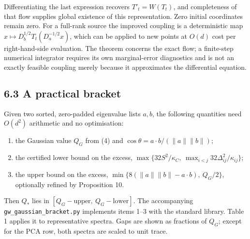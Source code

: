 \documentclass[
  british,
  11pt,
  a4paper,
]{article}
\providecommand{\tightlist}{%
  \setlength{\itemsep}{0pt}\setlength{\parskip}{0pt}}
\begin{document}
Differentiating the last expression recovers \(T'_t=W(T_t)\), and
completeness of that flow supplies global existence of this
representation. Zero initial coordinates remain zero. For a full-rank
source the improved coupling is a deterministic map
\(x\mapsto D_b^{1/2}T_t(D_a^{-1/2}x)\), which can be applied to new
points at \(O(d)\) cost per right-hand-side evaluation. The theorem
concerns the exact flow; a finite-step numerical integrator requires its
own marginal-error diagnostics and is not an exactly feasible coupling
merely because it approximates the differential equation.

\subsection{6.3 A practical bracket}\label{a-practical-bracket}

Given two sorted, zero-padded eigenvalue lists \(a,b\), the following
quantities need \(O(d^2)\) arithmetic and no optimisation:

\begin{enumerate}
\def\labelenumi{\arabic{enumi}.}
\tightlist
\item
  the Gaussian value \(Q_G\) from (4) and
  \(\cos\theta=a\cdot b/(\|a\|\|b\|)\);
\item
  the certified lower bound on the excess,
  \(\max\{32S^2/\kappa_C,\ \max_{i<j}32\Delta_{ij}^2/\kappa_{ij}\}\);
\item
  the upper bound on the excess,
  \(\min\{8(\|a\|\|b\|-a\cdot b),\ Q_G/2\}\), optionally refined by
  Proposition 10.
\end{enumerate}

Then \(Q_*\) lies in \([Q_G-\text{upper},\ Q_G-\text{lower}]\). The
accompanying \texttt{gw\_gaussian\_bracket.py} implements items 1--3
with the standard library. Table 1 applies it to representative spectra.
Gaps are shown as fractions of \(Q_G\); except for the PCA row, both
spectra are scaled to unit trace.
\end{document}
